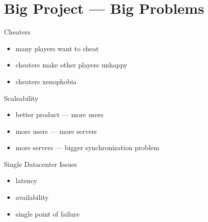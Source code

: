 \documentclass[aspectratio=169]{beamer}
\begin{document}
\section{Big Project --- Big Problems}
{
\begin{frame}[plain]{}
\end{frame}
}

\begin{frame}{Cheaters}
    \begin{itemize}
        \item many players want to cheat
        \item cheaters make other players unhappy
        \item cheaters xenophobia
    \end{itemize}
\end{frame}

\begin{frame}{Scaleability}
    \begin{itemize}
        \item better product --- more users
        \item more users --- more servers
        \item more servers --- bigger synchronization problem
    \end{itemize}
\end{frame}

\begin{frame}{Single Datacenter Issues}
    \begin{itemize}
        \item latency
        \item availability
        \item single point of failure
    \end{itemize}
\end{frame}
\end{document}

